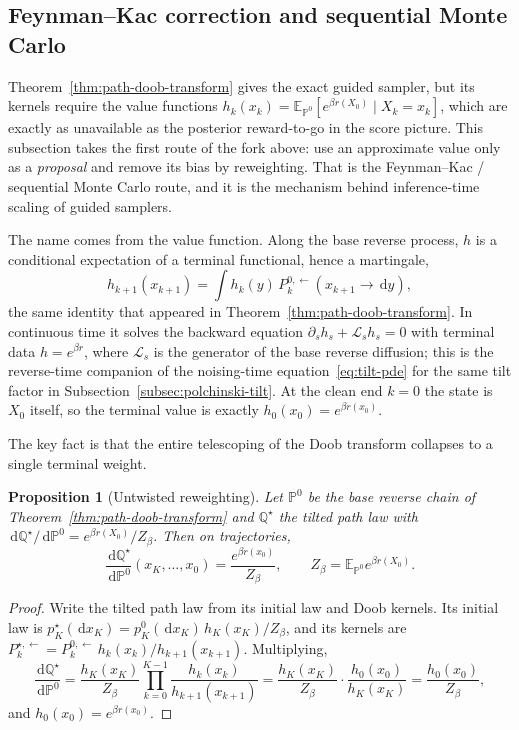 \documentclass[10pt,a4paper]{amsart}
\numberwithin{equation}{section}
\newtheorem{prop}[theorem]{Proposition}
\newcommand{\E}{\mathbb{E}}
\newcommand{\Pp}{\mathbb{P}}
\newcommand{\dd}{\,\mathrm{d}}
\begin{document}
\subsection{Feynman--Kac correction and sequential Monte Carlo}
\label{subsec:feynman-kac}

Theorem~\ref{thm:path-doob-transform} gives the exact guided sampler, but its
kernels require the value functions
$h_k(x_k)=\E_{\Pp^0}[e^{\beta r(X_0)}\mid X_k=x_k]$, which are exactly as
unavailable as the posterior reward-to-go in the score picture.  This subsection
takes the first route of the fork above: use an approximate value only as a
\emph{proposal} and remove its bias by reweighting.  That is the
Feynman--Kac / sequential Monte Carlo route, and it is the mechanism behind
inference-time scaling of guided samplers.

The name comes from the value function.  Along the base reverse process, $h$ is
a conditional expectation of a terminal functional, hence a martingale,
\[
    h_{k+1}(x_{k+1})=\int h_k(y)\,
    P_k^{0,\leftarrow}(x_{k+1}\to \dd y),
\]
the same identity that appeared in Theorem~\ref{thm:path-doob-transform}.  In
continuous time it solves the backward equation
$\partial_s h_s+\mathcal L_s h_s=0$ with terminal data $h=e^{\beta r}$, where
$\mathcal L_s$ is the generator of the base reverse diffusion; this is the
reverse-time companion of the noising-time equation~\eqref{eq:tilt-pde} for the
same tilt factor in Subsection~\ref{subsec:polchinski-tilt}.  At the clean end
$k=0$ the state is $X_0$ itself, so the terminal value is exactly
$h_0(x_0)=e^{\beta r(x_0)}$.

The key fact is that the entire telescoping of the Doob transform collapses to a
single terminal weight.

\begin{prop}[Untwisted reweighting]
\label{prop:untwisted-weight}
Let $\Pp^0$ be the base reverse chain of
Theorem~\ref{thm:path-doob-transform} and $\mathbb Q^\star$ the tilted path law
with $\dd\mathbb Q^\star/\dd\Pp^0=e^{\beta r(X_0)}/Z_\beta$.  Then on
trajectories,
\[
    \frac{\dd\mathbb Q^\star}{\dd\Pp^0}(x_K,\ldots,x_0)
    =
    \frac{e^{\beta r(x_0)}}{Z_\beta},
    \qquad
    Z_\beta=\E_{\Pp^0}e^{\beta r(X_0)}.
\]
\end{prop}

\begin{proof}
Write the tilted path law from its initial law and Doob kernels.  Its initial
law is $p_K^\star(\dd x_K)=p_K^0(\dd x_K)\,h_K(x_K)/Z_\beta$, and its kernels
are
$P_k^{\star,\leftarrow}
=P_k^{0,\leftarrow}\,h_k(x_k)/h_{k+1}(x_{k+1})$.  Multiplying,
\[
    \frac{\dd\mathbb Q^\star}{\dd\Pp^0}
    =
    \frac{h_K(x_K)}{Z_\beta}
    \prod_{k=0}^{K-1}\frac{h_k(x_k)}{h_{k+1}(x_{k+1})}
    =
    \frac{h_K(x_K)}{Z_\beta}\cdot\frac{h_0(x_0)}{h_K(x_K)}
    =
    \frac{h_0(x_0)}{Z_\beta},
\]
and $h_0(x_0)=e^{\beta r(x_0)}$.
\end{proof}
\end{document}
